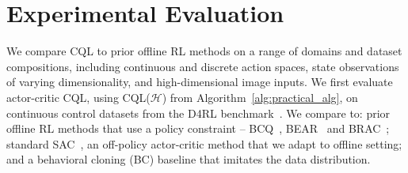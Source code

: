 \section{Experimental Evaluation}
\label{sec:experiments}




We compare CQL to prior offline RL methods on a range of domains and dataset compositions, including continuous and discrete action spaces, state observations of varying dimensionality, and high-dimensional image inputs. We first evaluate actor-critic CQL, using CQL($\mathcal{H}$) from Algorithm~\ref{alg:practical_alg}, on continuous control datasets from the D4RL benchmark~\citep{d4rl}.
We compare to: prior offline RL methods that use a policy constraint -- BCQ~\citep{fujimoto2018off}, BEAR~\citep{kumar2019stabilizing} and BRAC~\citep{wu2019behavior}; standard SAC~\citep{haarnoja}, an off-policy actor-critic method that we adapt to offline setting; and a behavioral cloning (BC) baseline that imitates the data distribution. 

